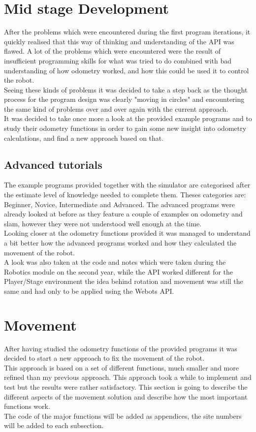 \begin{flushleft}
\section{Mid stage Development}
After the problems which were encountered during the first program iterations, it quickly realised that this way of thinking and understanding of the API was flawed. A lot of the problems which were encountered were the result of insufficient programming skills for what  was tried to do combined with bad understanding of how odometry worked, and how this could be used it to control the robot.\\
Seeing these kinds of problems it was decided to take a step back as the thought process for the program design was clearly "moving in circles" and encountering the same kind of problems over and over again with the current approach. \\
It was decided to take once more a look at the provided example programs and to study their odometry functions in order to gain some new insight into odometry calculations, and find a new approach based on that.

\subsection{Advanced tutorials}
The example programs provided together with the simulator are categorised after the estimate level of knowledge needed to complete them. Theses categories are: Beginner, Novice, Intermediate and Advanced. The advanced programs were already looked at before as they feature a couple of examples on odometry and slam, however they were not understood  well enough at the time.\\ 
Looking closer at the odometry functions provided it was managed to understand a bit better how the advanced programs worked and how they calculated the movement of the robot. \\[3ex]

A look was also taken at the code and notes which were taken during the Robotics module on the second year, while the API worked different for the Player/Stage environment the idea behind rotation and movement was still the same and had only to be applied using the Webots API.

\section{Movement}
After having studied the odometry functions of the provided programs it was decided to start a new approach to fix the movement of the robot.\\
This approach is based on a set of different functions, much smaller and more refined than my previous approach. This approach took a while to implement and test but the results were rather satisfactory. This section is going to describe the different aspects of the movement solution and describe how the most important functions work.\\
The code of the major functions will be added as appendices, the site numbers will be added to each subsection.


\end{flushleft}
